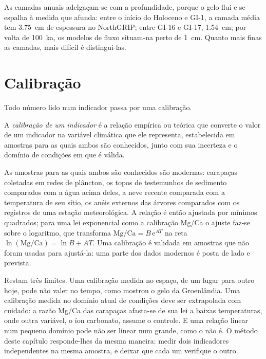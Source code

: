 As camadas anuais adelgaçam-se com a profundidade, porque o gelo flui e se espalha à medida que afunda: entre o início
do Holoceno e GI-1, a camada média tem \qty{3.75}{cm} de espessura no NorthGRIP; entre GI-16 e
GI-17, \qty{1.54}{cm}; por volta de \qty{100}{ka}, os modelos de fluxo situam-na perto de \qty{1}{cm}. Quanto mais finas as camadas, mais difícil
é distingui-las.

\section{Calibração}\label{sec:b2:climate-proxies:calibration}

Todo número lido num indicador passa por uma calibração.

\begin{definition}\label{def:b2:climate-proxies:calibration}
A \emph{calibração de um indicador} é a relação empírica ou teórica que
converte o valor de um indicador na variável climática que ele representa, estabelecida em amostras para
as quais ambos são conhecidos, junto com sua incerteza e o domínio de condições em que é
válida.
\end{definition}

As amostras para as quais ambos são conhecidos são modernas: carapaças coletadas em redes de plâncton, os topos de testemunhos de sedimento comparados com a água acima deles, a neve recente comparada com a
temperatura de seu sítio, os anéis externos das árvores comparados com os registros de uma estação meteorológica.
A relação é então ajustada por mínimos quadrados; para uma lei exponencial como a calibração
Mg/Ca o ajuste faz-se sobre o logaritmo, que transforma $\text{Mg/Ca} = B\,\mathrm{e}^{AT}$ na
reta $\ln(\text{Mg/Ca}) = \ln B + AT$. Uma calibração é validada em amostras que
não foram usadas para ajustá-la: uma parte dos dados modernos é posta de lado e prevista.

Restam três limites. Uma calibração medida no espaço, de um lugar para outro hoje, pode não valer
no tempo, como mostrou o gelo da Groenlândia. Uma calibração medida no domínio atual de condições
deve ser extrapolada com cuidado: a razão Mg/Ca das carapaças afasta-se de sua lei a baixas temperaturas, onde
outra variável, o íon carbonato, assume o controle. E uma relação linear num pequeno domínio
pode não ser linear num grande, como o  não é. O método deste capítulo
responde-lhes da mesma maneira: medir dois indicadores independentes na mesma amostra, e deixar que cada um
verifique o outro.


